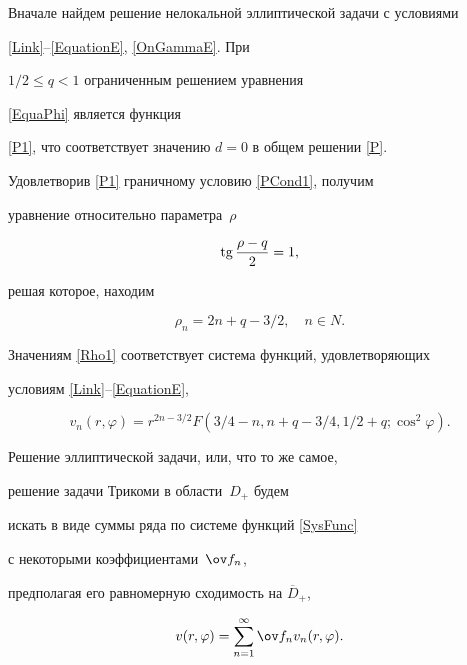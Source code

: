 Вначале найдем решение нелокальной эллиптической задачи с условиями


\eqref{Link}--\eqref{EquationE}, \eqref{OnGammaE}. При


$1/2\leq q<1$ ограниченным решением уравнения


\eqref{EquaPhi} является функция


\eqref{P1}, что соответствует значению $d=0$ в общем решении \eqref{P}.


Удовлетворив \eqref{P1} граничному условию \eqref{PCond1}, получим 


уравнение относительно параметра~$\rho$


$$


\tg\frac{\rho-q}{2} = 1,


$$


решая которое, находим


\begin{equation}\label{Rho1}


\rho_n = 2n+q-3/2, \quad n\in N.


\end{equation}





Значениям \eqref{Rho1} соответствует система функций, удовлетворяющих 


условиям \eqref{Link}--\eqref{EquationE},


\begin{equation}\label{SysFunc}


v_n(r,\varphi)=r^{2n-3/2} F({3/4-n},{n+q-3/4},{1/2+q};{\cos^2\varphi}).


\end{equation}





Решение эллиптической задачи, или, что то же самое, 


решение задачи Трикоми в области~$D_+$ будем


искать в виде суммы ряда по системе функций \eqref{SysFunc} 


с некоторыми коэффициентами~$\ov f_n$,


предполагая его равномерную сходимость на $\overline{D}_+$,


\begin{equation}\label{Series1}


v(r,\varphi)=\sum\limits_{n=1}^\infty \ov f_n v_n(r,\varphi).


\end{equation}


